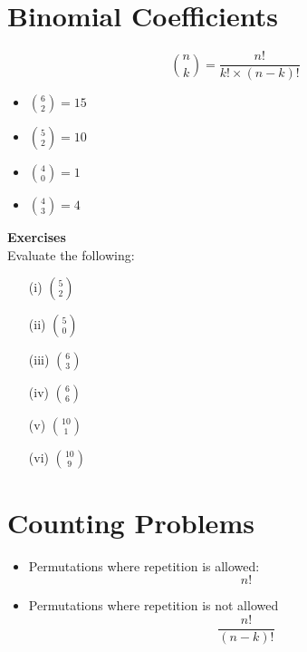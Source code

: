 \documentclass[12pt]{report}
\begin{document}
\section*{Binomial Coefficients}
{
	\LARGE
\begin{framed}

		\[ {n \choose k} = \frac{n!}{k! \times (n-k)!} \]
\end{framed}		
		\begin{multicols}{2}
				\begin{itemize}
					\item ${6 \choose 2} = 15$
					\item ${5 \choose 2} = 10$  
					\item ${4 \choose 0} = 1$  
					\item ${4 \choose 3} = 4$  
				\end{itemize}
		\end{multicols}	
		\bigskip				
\noindent \textbf{Exercises}\\				
		Evaluate the following:
		\begin{multicols}{2}
			\begin{enumerate}
				\item[(i)] ${5 \choose 2}$
				\item[(ii)] ${5 \choose 0}$
				\item[(iii)] ${6 \choose 3}$
				\item[(iv)] ${6 \choose 6}$
				\item[(v)] ${10 \choose 1}$
				\item[(vi)] ${10 \choose 9}$
			\end{enumerate}        
		\end{multicols}		
}

\newpage
		\section{Counting Problems}
		\large
		\begin{itemize}
			\item Permutations where repetition is allowed: 
			\[ n! \]
			\item Permutations where repetition is not allowed
			\[ \frac{n!}{(n-k)!} \]
		\end{itemize}
		
		
		
\end{document}
